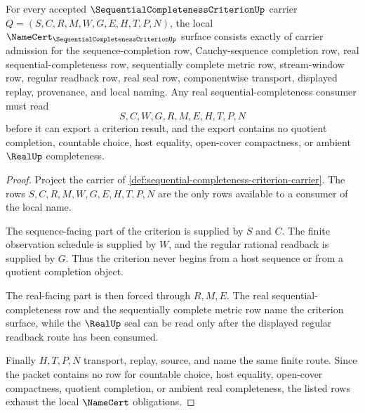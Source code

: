 \begin{theorem}
\label{thm:sequential-completeness-criterion-namecert-obligations}
For every accepted $\SequentialCompletenessCriterionUp$ carrier $Q=(S,C,R,M,W,G,E,H,T,P,N)$, the local $\NameCert_{\SequentialCompletenessCriterionUp}$ surface consists exactly of carrier admission for the sequence-completion row, Cauchy-sequence completion row, real sequential-completeness row, sequentially complete metric row, stream-window row, regular readback row, real seal row, componentwise transport, displayed replay, provenance, and local naming. Any real sequential-completeness consumer must read
$$
S,C,W,G,R,M,E,H,T,P,N
$$
before it can export a criterion result, and the export contains no quotient completion, countable choice, host equality, open-cover compactness, or ambient $\RealUp$ completeness.
\end{theorem}
\begin{proof}
Project the carrier of \autoref{def:sequential-completeness-criterion-carrier}. The rows $S,C,R,M,W,G,E,H,T,P,N$ are the only rows available to a consumer of the local name.

The sequence-facing part of the criterion is supplied by $S$ and $C$. The finite observation schedule is supplied by $W$, and the regular rational readback is supplied by $G$. Thus the criterion never begins from a host sequence or from a quotient completion object.

The real-facing part is then forced through $R,M,E$. The real sequential-completeness row and the sequentially complete metric row name the criterion surface, while the $\RealUp$ seal can be read only after the displayed regular readback route has been consumed.

Finally $H,T,P,N$ transport, replay, source, and name the same finite route. Since the packet contains no row for countable choice, host equality, open-cover compactness, quotient completion, or ambient real completeness, the listed rows exhaust the local $\NameCert$ obligations.
\end{proof}


